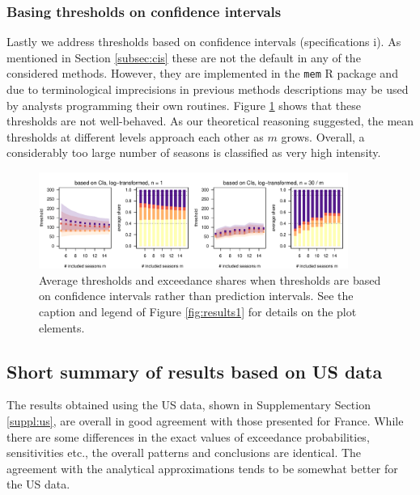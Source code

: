 \documentclass[12pt]{article}
\begin{document}
\subsubsection{Basing thresholds on confidence intervals}

Lastly we address thresholds based on confidence intervals (specifications i). As mentioned in Section \ref{subsec:cis} these are not the default in any of the  considered methods. However, they are implemented in the \texttt{mem} R package and due to terminological imprecisions in previous methods descriptions may be used by analysts programming their own routines. Figure \ref{fig:cis} shows that these thresholds are not well-behaved. As our theoretical reasoning suggested, the mean thresholds at different levels approach each other as $m$ grows. Overall, a considerably too large number of seasons is classified as very high intensity.

\begin{figure}[h!]
\begin{center}
\includegraphics[width=0.9\textwidth]{figure/plot_ci_fr.pdf}
\end{center}
\caption{Average thresholds and exceedance shares when thresholds are based on confidence intervals rather than prediction intervals. See the caption and legend of Figure \ref{fig:results1} for details on the plot elements.}
\label{fig:cis}
\end{figure}




\subsection{Short summary of results based on US data}
\label{subsec:results_us}

The results obtained using the US data, shown in Supplementary Section \ref{suppl:us}, are overall in good agreement with those presented for France. While there are some differences in the exact values of exceedance probabilities, sensitivities etc., the overall patterns and conclusions are identical. The agreement with the analytical approximations tends to be somewhat better for the US data. %
\end{document}
